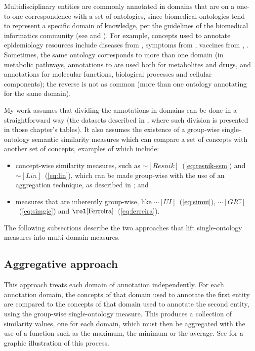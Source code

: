Multidisciplinary entities are commonly annotated in domains that are on a one-to-one correspondence with a set of ontologies, since biomedical ontologies tend to represent a specific domain of knowledge, per the guidelines of the biomedical informatics community (see  and ). For example, concepts used to annotate epidemiology resources include diseases from , symptoms from , vaccines from , \etc. Sometimes, the same ontology corresponds to more than one domain (\eg in metabolic pathways, annotations to  are used both for metabolites and drugs, and  annotations for molecular functions, biological processes and cellular components); the reverse is not as common (more than one ontology annotating for the same domain).

My work assumes that dividing the annotations in domains can be done in a straightforward way (\cf the datasets described in , where such division is presented in those chapter's tables). It also assumes the existence of a group-wise single-ontology semantic similarity measures which can compare a set of concepts with another set of concepts, examples of which include:
\begin{itemize}
    \item concept-wise similarity measures, such as $\sim[Resnik]$~(\eqref{eq:resnik-ssm}) and $\sim[Lin]$~(\eqref{eq:lin}), which can be made group-wise with the use of an aggregation technique, as described in ; and
    \item measures that are inherently group-wise, like $\sim[UI]$~(\eqref{eq:simui}), $\sim[GIC]$~(\eqref{eq:simgic}) and $\ferreira$~(\eqref{eq:ferreira}).
\end{itemize}

The following subsections describe the two approaches that lift single-ontology measures into multi-domain measures.


\subsection{Aggregative approach} \label{sub:approaches/aggregative}

This approach treats each domain of annotation independently. For each annotation domain, the concepts of that domain used to annotate the first entity are compared to the concepts of that domain used to annotate the second entity, using the group-wise single-ontology measure. This produces a collection of similarity values, one for each domain, which must then be aggregated with the use of a function such as the maximum, the minimum or the average. See  for a graphic illustration of this process.

